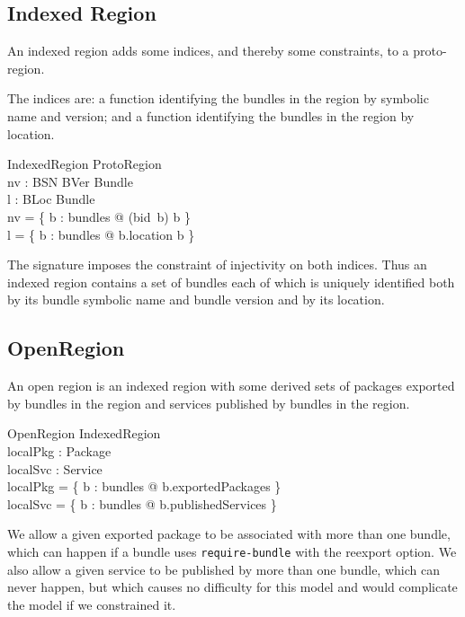\documentclass[a4paper,9pt]{article}
\begin{document}
\subsection{Indexed Region}

An indexed region adds some indices, and thereby some constraints, to a proto-region.

The indices are: a function identifying the bundles in the region by
symbolic name and version; and a function identifying the bundles in the region by location.
\begin{schema}{IndexedRegion}
  ProtoRegion \\
  nv : BSN \cross BVer \pinj Bundle \\
  l : BLoc \pinj Bundle \\
\where
  nv = \{ b : bundles @ (bid~b) \mapsto b \} \\
  l = \{ b : bundles @ b.location \mapsto b \} \\
\end{schema}
The signature imposes the constraint of injectivity on both indices.
Thus an indexed region contains a set of bundles each of which is uniquely identified
both by its bundle symbolic name and bundle version and by its location.

\subsection{OpenRegion}

An open region is an indexed region with some derived sets of packages exported by bundles in the region
and services published by bundles in the region.

\begin{schema}{OpenRegion}
  IndexedRegion \\
  localPkg : \power Package \\
  localSvc : \power Service \\
\where
  localPkg = \bigcup \{ b : bundles @ b.exportedPackages \} \\
  localSvc = \bigcup \{ b : bundles @ b.publishedServices \} \\
\end{schema}
We allow a given exported package to be associated with more than one bundle, which can happen if a bundle uses
\texttt{require-bundle} with the reexport option.
We also allow a given service to be published by more than one bundle, which can never happen, but which causes
no difficulty for this model and would complicate the model if we constrained it.
\end{document}
